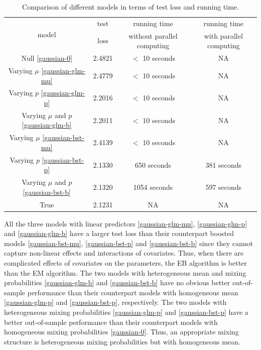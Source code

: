 \documentclass[11pt]{article}
\numberwithin{equation}{section}
\begin{document}
\begin{table}[htp!]
	\caption{Comparison of different models in terms of test loss and running time.}\label{gaussian-summary}
			\centering
	\begin{tabular}{c|ccc}
		\hline
		\multirow{2}{*}{model} & test       & running time               & running time            \\
		& loss & without parallel computing & with parallel computing \\ \hline
		Null \eqref{gaussian-0}                   & 2.4821         & $<$ 10 seconds       & NA    \\
		Varying $\mu$	\eqref{gaussian-glm-mu}                & 2.4779         & $<$ 10 seconds       & NA    \\
		Varying  $p$ \eqref{gaussian-glm-p}                 & 2.2016         & $<$ 10 seconds       & NA   \\
		Varying $\mu$ and $p$ \eqref{gaussian-glm-b}              & 2.2011         & $<$ 10 seconds       & NA   \\
		Varying $\mu$ \eqref{gaussian-bst-mu}                & 2.4139         & $<$ 10 seconds       & NA    \\
		Varying $p$ \eqref{gaussian-bst-p}                 & 2.1330          &            650 seconds                & 381 seconds           \\
		Varying $\mu$ and $p$ \eqref{gaussian-bst-b}              & 2.1320          &              1054 seconds              & 597 seconds               \\
		True                   & 2.1231         &            NA                &               NA         \\ \hline
	\end{tabular}
\end{table}
All the three models with linear predictors  \eqref{gaussian-glm-mu}, \eqref{gaussian-glm-p} and \eqref{gaussian-glm-b} have a larger test loss 
than their counterpart boosted models \eqref{gaussian-bst-mu}, \eqref{gaussian-bst-p} and \eqref{gaussian-bst-b} 
since they cannot capture non-linear effects and interactions of covariates.
Thus, when there are complicated effects of covariates on the parameters, the EB algorithm is better than the EM algorithm.
The two models with heterogeneous mean and mixing probabilities \eqref{gaussian-glm-b} and \eqref{gaussian-bst-b}  have no obvious better out-of-sample performance than their counterpart models with homogeneous mean \eqref{gaussian-glm-p} and \eqref{gaussian-bst-p}, respectively.
The two models with heterogeneous mixing probabilities \eqref{gaussian-glm-p} and \eqref{gaussian-bst-p} have a better out-of-sample performance than their counterpart models with homogeneous mixing probabilities \eqref{gaussian-0}.
Thus, an appropriate mixing structure is heterogeneous mixing probabilities but with homogeneous mean. 
\end{document}
